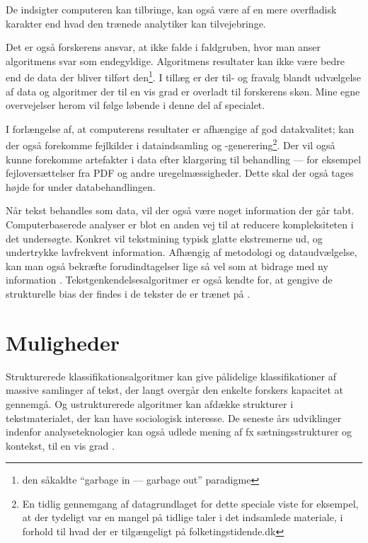De indsigter computeren kan tilbringe, kan også være af en mere overfladisk karakter end hvad den trænede analytiker kan tilvejebringe.

Det er også forskerens ansvar, at ikke falde i faldgruben, hvor man anser algoritmens svar som endegyldige.
Algoritmens resultater kan ikke være bedre end de data der bliver tilført den\footnote{den såkaldte “garbage in — garbage out” paradigme}.
I tillæg er der til- og fravalg blandt udvælgelse af data og algoritmer der til en vis grad er overladt til forskerens skøn.
Mine egne overvejelser herom vil følge løbende i denne del af specialet.

I forlængelse af, at computerens resultater er afhængige af god datakvalitet; kan der også forekomme fejlkilder i dataindsamling og -generering\footnote{
En tidlig gennemgang af datagrundlaget for dette speciale viste for eksempel, at der tydeligt var en mangel på tidlige taler i det indsamlede materiale, i forhold til hvad der er tilgængeligt på folketingstidende.dk}.
Der vil også kunne forekomme artefakter i data efter klargøring til behandling --- for eksempel fejloversættelser fra PDF og andre uregelmæssigheder.
Dette skal der også tages højde for under databehandlingen.

Når tekst behandles som data, vil der også være noget information der går tabt.
Computerbaserede analyser er blot en anden vej til at reducere kompleksiteten i det undersøgte.
Konkret vil tekstmining typisk glatte ekstremerne ud, og undertrykke lavfrekvent information.
Afhængig af metodologi og dataudvælgelse, kan man også bekræfte forudindtagelser lige så vel som at bidrage med ny information \autocite[s. 15]{kwartlerTextMiningPractice2017}.
Tekstgenkendelsesalgoritmer er også kendte for, at gengive de strukturelle bias der findes i de tekster de er trænet på \autocite{kiritchenkoExaminingGenderRace2018}.

\section{Muligheder}

Strukturerede klassifikationsalgoritmer kan give pålidelige klassifikationer af massive samlinger af tekst, der langt overgår den enkelte forskers kapacitet at gennemgå.
Og ustrukturerede algoritmer kan afdække strukturer i tekstmaterialet, der kan have sociologisk interesse.
De seneste års udviklinger indenfor analyseteknologier kan også udlede mening af fx sætningsstrukturer og kontekst, til en vis grad
\autocite[s. 22]{evansMachineTranslationMining2016}.

